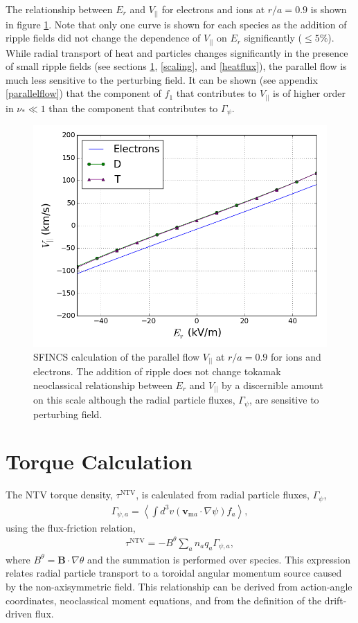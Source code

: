 \documentclass[aip, pop, preprint]{revtex4-1}
\numberwithin{figure}{section}
\numberwithin{equation}{section}
\begin{document}
The relationship between $E_r$ and $V_{||}$ for electrons and ions at $r/a = 0.9$ is shown in figure \ref{fig:Er_flow}. Note that only one curve is shown for each species as the addition of ripple fields did not change the dependence of $V_{||}$ on $E_r$ significantly ($\leq 5 \%$). While radial transport of heat and particles changes significantly in the presence of small ripple fields (see sections \ref{torque}, \ref{scaling}, and \ref{heatflux}), the parallel flow is much less sensitive to the perturbing field. It can be shown (see appendix \ref{parallelflow}) that the component of $f_1$ that contributes to $V_{||}$ is of higher order in $\nu_* \ll 1 $ than the component that contributes to $\Gamma_{\psi}$. 

\begin{figure}[h!]
\centering
\includegraphics[width=.7\textwidth]{Er_flow.png}
\caption{\label{fig:Er_flow} SFINCS calculation of the parallel flow $V_{||}$ at $r/a = 0.9$ for ions and electrons. The addition of ripple does not change tokamak neoclassical relationship between $E_r$ and $V_{||}$ by a discernible amount on this scale although the radial particle fluxes, $\Gamma_{\psi}$, are sensitive to perturbing field.}
\end{figure}

\FloatBarrier

\section{Torque Calculation}\label{torque}

The NTV torque density, $\tau^{\text{NTV}}$, is calculated from radial particle fluxes, $\Gamma_{\psi}$, 
\begin{gather}
\Gamma_{\psi,a} = \left \langle \int d^3v (\bm{v}_{\text{m}a} \cdot \nabla \psi) f_a \right \rangle,
\label{eq:particleflux}
\end{gather}
using the flux-friction relation,
\begin{gather}
\tau^{\text{NTV}} = - B^{\theta} \sum_a n_a q_a \Gamma_{\psi, a},
\end{gather}
where $B^{\theta} = \bm{B} \cdot \nabla \theta$ and the summation is performed over species. This expression relates radial particle transport to a toroidal angular momentum source caused by the non-axisymmetric field. This relationship can be derived from action-angle coordinates,\cite{Albert2016} neoclassical moment equations,\cite{Shaing1986} and from the definition of the drift-driven flux.\cite{Shaing2006} 
\end{document}
